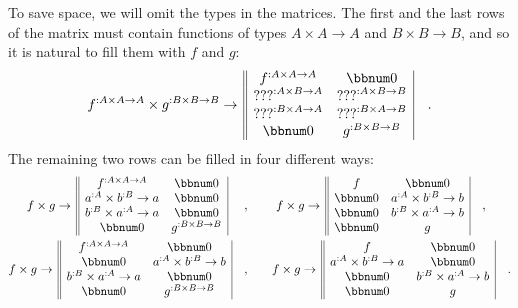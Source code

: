 To save space, we will omit the types in the matrices. The first and
the last rows of the matrix must contain functions of types $A\times A\rightarrow A$
and $B\times B\rightarrow B$, and so it is natural to fill them with
$f$ and $g$:
\[
f^{:A\times A\rightarrow A}\times g^{:B\times B\rightarrow B}\rightarrow\,\begin{array}{||cc|}
f^{:A\times A\rightarrow A} & \bbnum 0\\
\text{???}^{:A\times B\rightarrow A} & \text{???}^{:A\times B\rightarrow B}\\
\text{???}^{:B\times A\rightarrow A} & \text{???}^{:B\times A\rightarrow B}\\
\bbnum 0 & g^{:B\times B\rightarrow B}
\end{array}\quad.
\]
The remaining two rows can be filled in four different ways:
\begin{align*}
f\times g\rightarrow\,\begin{array}{||cc|}
f^{:A\times A\rightarrow A} & \bbnum 0\\
a^{:A}\times b^{:B}\rightarrow a & \bbnum 0\\
b^{:B}\times a^{:A}\rightarrow a & \bbnum 0\\
\bbnum 0 & g^{:B\times B\rightarrow B}
\end{array}~\quad,\quad\quad & ~f\times g\rightarrow\,\begin{array}{||cc|}
f & \bbnum 0\\
\bbnum 0 & a^{:A}\times b^{:B}\rightarrow b\\
\bbnum 0 & b^{:B}\times a^{:A}\rightarrow b\\
\bbnum 0 & g
\end{array}\quad,\\
f\times g\rightarrow\,\begin{array}{||cc|}
f^{:A\times A\rightarrow A} & \bbnum 0\\
\bbnum 0 & a^{:A}\times b^{:B}\rightarrow b\\
b^{:B}\times a^{:A}\rightarrow a & \bbnum 0\\
\bbnum 0 & g^{:B\times B\rightarrow B}
\end{array}\quad,\quad\quad & f\times g\rightarrow\,\begin{array}{||cc|}
f & \bbnum 0\\
a^{:A}\times b^{:B}\rightarrow a & \bbnum 0\\
\bbnum 0 & b^{:B}\times a^{:A}\rightarrow b\\
\bbnum 0 & g
\end{array}\quad.
\end{align*}
